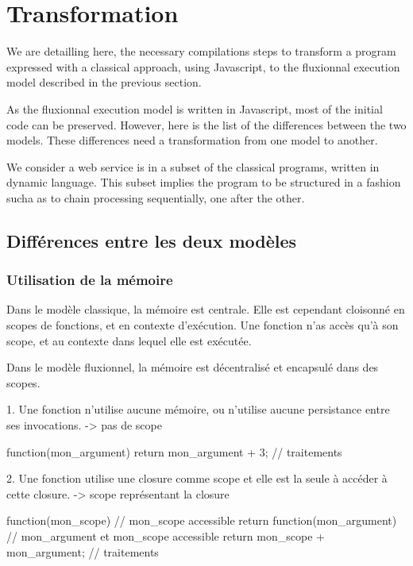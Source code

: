 \section{Transformation}

	We are detailling here, the necessary compilations steps to transform a program expressed with a classical approach, using Javascript, to the fluxionnal execution model described in the previous section.

	As the fluxionnal execution model is written in Javascript, most of the initial code can be preserved.
	However, here is the list of the differences between the two models.
	These differences need a transformation from one model to another.

	We consider a web service is in a subset of the classical programs, written in dynamic language.
	This subset implies the program to be structured in a fashion sucha as to chain processing sequentially, one after the other.

	\subsection{Différences entre les deux modèles}

		\subsubsection{Utilisation de la mémoire}

			Dans le modèle classique, la mémoire est centrale.
			Elle est cependant cloisonné en scopes de fonctions, et en contexte d'exécution.
			Une fonction n'as accès qu'à son scope, et au contexte dans lequel elle est exécutée.

			Dans le modèle fluxionnel, la mémoire est décentralisé et encapsulé dans des scopes.

			1. Une fonction n'utilise aucune mémoire, ou n'utilise aucune persistance entre ses invocations.
			    -> pas de scope

			\begin{code}[Javascript, caption={Code fluxionnel},label={lst:mem1}]
				function(mon_argument) {
				    return mon_argument + 3; // traitements
				}
			\end{code}


			2. Une fonction utilise une closure comme scope et elle est la seule à accéder à cette closure.
			    -> scope représentant la closure

			\begin{code}[Javascript, caption={Code fluxionnel},label={lst:mem2}]
				function(mon_scope) {
				    // mon_scope accessible
				    return function(mon_argument) {
				        // mon_argument et mon_scope accessible
				        return mon_scope + mon_argument; // traitements
				    }
				}
			\end{code}

